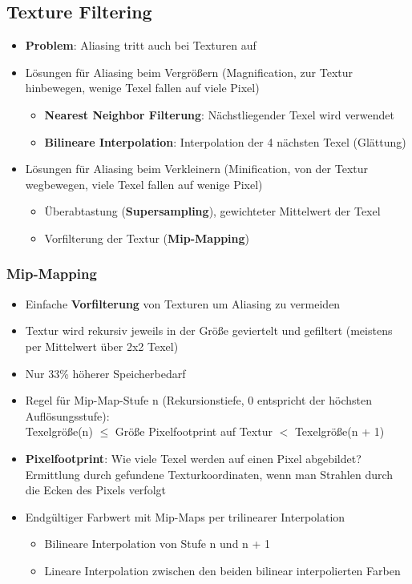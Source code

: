 \subsection{Texture Filtering}%
\label{tex:sub:texture_filtering}

\begin{itemize}
	\item \textbf{Problem}: Aliasing tritt auch bei Texturen auf
	\item Lösungen für Aliasing beim Vergrößern (Magnification, zur Textur hinbewegen, wenige Texel fallen auf viele Pixel)
	\begin{itemize}
		\item \textbf{Nearest Neighbor Filterung}: Nächstliegender Texel wird verwendet
		\item \textbf{Bilineare Interpolation}: Interpolation der 4 nächsten Texel (Glättung)
	\end{itemize}
	\item Lösungen für Aliasing beim Verkleinern (Minification, von der Textur wegbewegen, viele Texel fallen auf wenige Pixel)
	\begin{itemize}
		\item Überabtastung (\textbf{Supersampling}), gewichteter Mittelwert der Texel
		\item Vorfilterung der Textur (\textbf{Mip-Mapping})
	\end{itemize}
\end{itemize}

\subsubsection{Mip-Mapping}%
\label{tex:subs:mip_mapping}

\begin{itemize}
	\item Einfache \textbf{Vorfilterung} von Texturen um Aliasing zu vermeiden
	\item Textur wird rekursiv jeweils in der Größe geviertelt und gefiltert (meistens per Mittelwert über 2x2 Texel)
	\item Nur 33\% höherer Speicherbedarf
	\item Regel für Mip-Map-Stufe n (Rekursionstiefe, 0 entspricht der höchsten Auflösungsstufe):\\Texelgröße(n) $\leq$ Größe Pixelfootprint auf Textur $<$ Texelgröße(n + 1)
	\item \textbf{Pixelfootprint}: Wie viele Texel werden auf einen Pixel abgebildet? Ermittlung durch gefundene Texturkoordinaten, wenn man Strahlen durch die Ecken des Pixels verfolgt
	\item Endgültiger Farbwert mit Mip-Maps per trilinearer Interpolation
	\begin{itemize}
		\item Bilineare Interpolation von Stufe n und n + 1
		\item Lineare Interpolation zwischen den beiden bilinear interpolierten Farben
	\end{itemize}
\end{itemize}

